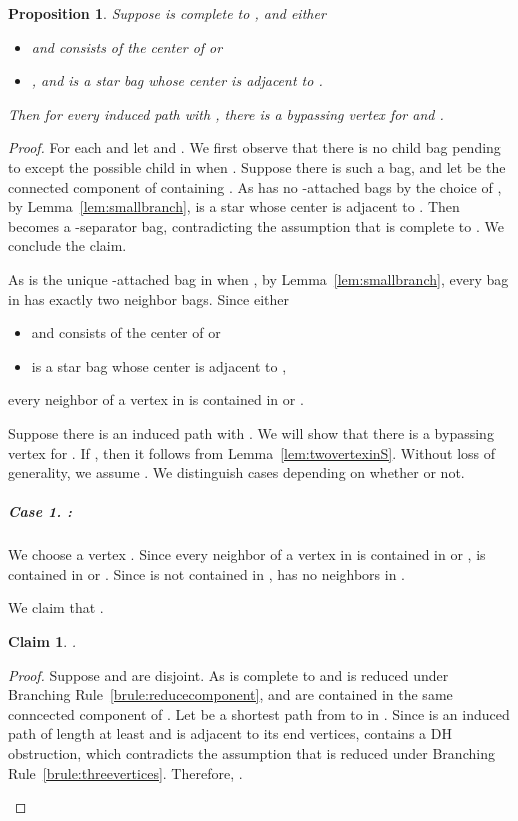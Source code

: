 \documentclass[11pt]{elsarticle}
\newtheorem{PROP}[theorem]{Proposition}
\newtheorem{claim}{Claim}
\newenvironment{clproof}{\begin{list}{}{\setlength{\leftmargin}{5mm}} \item {\it Proof.} }{\hfill\end{list}\medskip}
\begin{document}
\begin{PROP}
  \label{prop:complete2}
  Suppose  is complete to , and either 
 \begin{itemize}
 \item  and  consists of the center of  or
 \item  , and  is a star bag   whose center is adjacent to .
 \end{itemize}
  Then for every induced path  with , 
  there is a bypassing vertex for  and .  
  \end{PROP}
\begin{proof}
For each  and let  and .
We first observe that there is no child bag  pending to  except the possible child in  when .
Suppose there is such a bag, and let  be the connected component of  containing .
As  has no -attached bags by the choice of , by Lemma~\ref{lem:smallbranch},  is a star whose center is adjacent to . 
Then  becomes a -separator bag, contradicting the assumption that  is complete to .
We conclude the claim.

As  is the unique -attached bag in  when , 
by Lemma~\ref{lem:smallbranch}, 
every bag in  has exactly two neighbor bags.
Since either 
\begin{itemize}
 \item  and  consists of the center of  or
\item  is a star bag whose center is adjacent to ,
\end{itemize}
every neighbor of a vertex in  is contained in  or .

Suppose there is an induced path  with . We will show that there is a bypassing vertex for .
If , then it follows from Lemma~\ref{lem:twovertexinS}. 
Without loss of generality, we assume .
We distinguish cases depending on whether  or not.



\subparagraph{\textbf{Case 1.}  :}  

We choose a vertex .
Since every neighbor of a vertex in  is contained in  or , 
 is contained in  or .
Since  is not contained in ,  has no neighbors in .

We claim that .

\begin{claim}
.
\end{claim}
\begin{clproof}
Suppose  and  are disjoint.
As  is complete to  and  is reduced under Branching Rule~\ref{brule:reducecomponent},  and  are contained in the same conncected component of .
Let  be a shortest path from  to  in .
Since  is an induced path of length at least  and  is adjacent to its end vertices, 
 contains a DH obstruction, which contradicts the assumption that  is reduced under Branching Rule~\ref{brule:threevertices}.
Therefore, . 
\end{clproof}


\end{proof}
\end{document}
